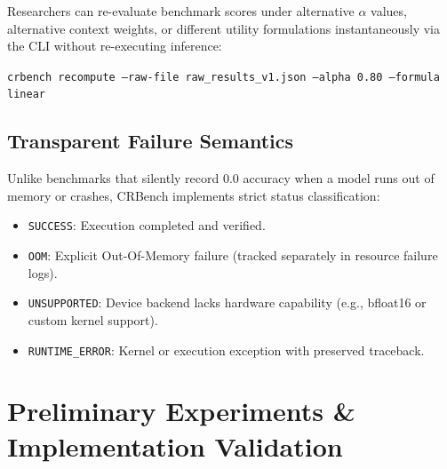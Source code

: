 \documentclass[11pt,a4paper]{article}
\begin{document}
Researchers can re-evaluate benchmark scores under alternative $\alpha$ values, alternative context weights, or different utility formulations instantaneously via the CLI without re-executing inference:
\begin{center}
\texttt{crbench recompute --raw-file raw\_results\_v1.json --alpha 0.80 --formula linear}
\end{center}

\subsection{Transparent Failure Semantics}
Unlike benchmarks that silently record $0.0$ accuracy when a model runs out of memory or crashes, CRBench implements strict status classification:
\begin{itemize}[leftmargin=*]
    \item \texttt{SUCCESS}: Execution completed and verified.
    \item \texttt{OOM}: Explicit Out-Of-Memory failure (tracked separately in resource failure logs).
    \item \texttt{UNSUPPORTED}: Device backend lacks hardware capability (e.g., bfloat16 or custom kernel support).
    \item \texttt{RUNTIME\_ERROR}: Kernel or execution exception with preserved traceback.
\end{itemize}

\section{Preliminary Experiments \& Implementation Validation}
\label{sec:experiments}
\end{document}

